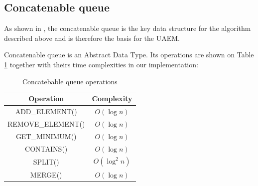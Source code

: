 \documentclass[a4paper,english,numberwithinsect,notab]{eurocg20-submission}
\begin{document}
\subsection{Concatenable queue}

	As shown in \cite{overmars}, the concatenable queue is the key data structure for the algorithm described above and is therefore the basis for the UAEM.
	
	Concatenable queue is an Abstract Data Type. Its operations are shown on Table \ref{table:cqueue-operations} together with theirs time complexities in our implementation:
	
	\begin{table}[htbp]
		\caption{Concatebable queue operations}
		\label{table:cqueue-operations}
		\begin{center}
			\begin{tabular}{|c|c|}
				\hline
				\textbf{Operation} & \textbf{Complexity} \\
				\hline
				ADD\_ELEMENT() & $O(\log n)$ \\
				\hline
				REMOVE\_ELEMENT() & $O(\log n)$ \\
				\hline
				GET\_MINIMUM() & $O(\log n)$ \\
				\hline
				CONTAINS() & $O(\log n)$ \\
				\hline
				SPLIT() & $O(\log^2 n)$ \\
				\hline
				MERGE() & $O(\log n)$ \\
				\hline
			\end{tabular} 
		\end{center}
	\end{table} 
	
	
	
	
	
\end{document}
